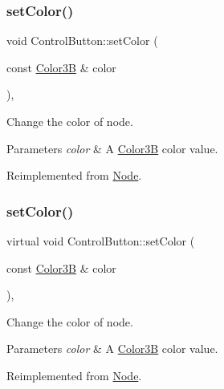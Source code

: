 \subsubsection{\texorpdfstring{set\+Color()}{setColor()}\hspace{0.1cm}{\footnotesize\ttfamily [1/2]}}
{\footnotesize\ttfamily void Control\+Button\+::set\+Color (\begin{DoxyParamCaption}\item[{const \hyperlink{structColor3B}{Color3B} \&}]{color }\end{DoxyParamCaption})\hspace{0.3cm}{\ttfamily [override]}, {\ttfamily [virtual]}}

Change the color of node. 
\begin{DoxyParams}{Parameters}
{\em color} & A \hyperlink{structColor3B}{Color3B} color value. \\
\hline
\end{DoxyParams}


Reimplemented from \hyperlink{classNode_af45037de5b13602263b1ce51b50cafdd}{Node}.

\mbox{\label{classControlButton_ade75d696a57fbe334ee40152aa2f4bc8}} 
\subsubsection{\texorpdfstring{set\+Color()}{setColor()}\hspace{0.1cm}{\footnotesize\ttfamily [2/2]}}
{\footnotesize\ttfamily virtual void Control\+Button\+::set\+Color (\begin{DoxyParamCaption}\item[{const \hyperlink{structColor3B}{Color3B} \&}]{color }\end{DoxyParamCaption})\hspace{0.3cm}{\ttfamily [override]}, {\ttfamily [virtual]}}

Change the color of node. 
\begin{DoxyParams}{Parameters}
{\em color} & A \hyperlink{structColor3B}{Color3B} color value. \\
\hline
\end{DoxyParams}


Reimplemented from \hyperlink{classNode_af45037de5b13602263b1ce51b50cafdd}{Node}.

